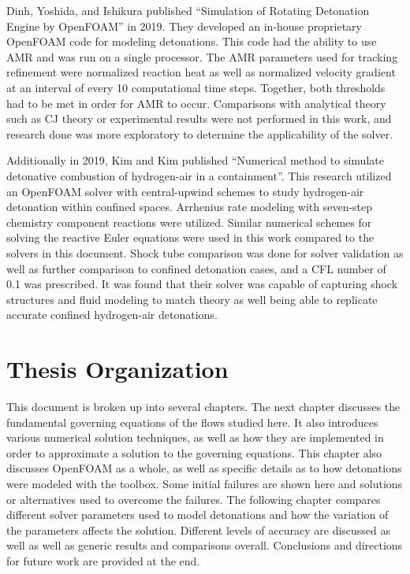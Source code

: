 Dinh, Yoshida, and Ishikura published ``Simulation of Rotating Detonation Engine by OpenFOAM''\cite{dinh} in 2019. They developed an in-house proprietary OpenFOAM code for modeling detonations. This code had the ability to use AMR and was run on a single processor. The AMR parameters used for tracking refinement were normalized reaction heat as well as normalized velocity gradient at an interval of every 10 computational time steps. Together, both thresholds had to be met in order for AMR to occur. Comparisons with analytical theory such as CJ theory or experimental results were not performed in this work, and research done was more exploratory to determine the applicability of the solver. 

Additionally in 2019, Kim and Kim published ``Numerical method to simulate detonative combustion of hydrogen-air in a containment''\cite{kim}. This research utilized an OpenFOAM solver with central-upwind schemes to study hydrogen-air detonation within confined spaces. Arrhenius rate modeling with seven-step chemistry component reactions were utilized. Similar numerical schemes for solving the reactive Euler equations were used in this work compared to the solvers in this document. Shock tube comparison was done for solver validation as well as further comparison to confined detonation cases, and a CFL number of 0.1 was prescribed. It was found that their solver was capable of capturing shock structures and fluid modeling to match theory as well being able to replicate accurate confined hydrogen-air detonations. 

\section{Thesis Organization}
This document is broken up into several chapters. The next chapter discusses the fundamental governing equations of the flows studied here. It also introduces various numerical solution techniques, as well as how they are implemented in order to approximate a solution to the governing equations. This chapter also discusses OpenFOAM as a whole, as well as specific details as to how detonations were modeled with the toolbox. Some initial failures are shown here and solutions or alternatives used to overcome the failures. The following chapter compares different solver parameters used to model detonations and how the variation of the parameters affects the solution. Different levels of accuracy are discussed as well as well as generic results and comparisons overall. Conclusions and directions for future work are provided at the end.